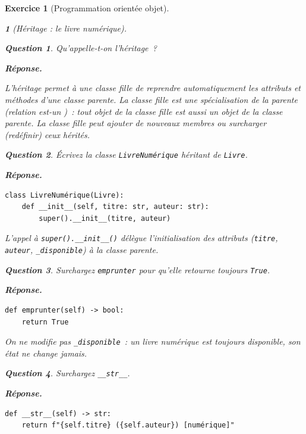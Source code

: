 \documentclass{article}
\theoremstyle{exostyle}
\newtheorem{exo}{Exercice}
\theoremstyle{partiestyle}
\newtheorem{partie}{}[exo]
\theoremstyle{questionstyle}
\newtheorem{questionpartie}{Question}[partie]
\newenvironment{reponse}{%
    \par\smallskip\noindent\textbf{Réponse.}\enspace\ignorespaces
}{%
    \par\smallskip
}
\begin{document}
\begin{exo}[Programmation orientée objet]
\begin{partie}[Héritage : le livre numérique]
        \begin{questionpartie}
            Qu'appelle-t-on l'héritage~?
        \end{questionpartie}
        \begin{reponse}
            L'héritage permet à une classe \textit{fille} de reprendre automatiquement les attributs et méthodes d'une classe \textit{parente}. La classe fille est une spécialisation de la parente (relation \og est-un \fg{})~: tout objet de la classe fille \textit{est aussi} un objet de la classe parente. La classe fille peut ajouter de nouveaux membres ou \textit{surcharger} (redéfinir) ceux hérités.
        \end{reponse}

        \begin{questionpartie}
            Écrivez la classe \texttt{LivreNumérique} héritant de \texttt{Livre}.
        \end{questionpartie}
        \begin{reponse}
\begin{lstlisting}
class LivreNumérique(Livre):
    def __init__(self, titre: str, auteur: str):
        super().__init__(titre, auteur)
\end{lstlisting}
            L'appel à \texttt{super().\_\_init\_\_()} délègue l'initialisation des attributs (\texttt{titre}, \texttt{auteur}, \texttt{\_disponible}) à la classe parente.
        \end{reponse}

        \begin{questionpartie}
            Surchargez \texttt{emprunter} pour qu'elle retourne toujours \texttt{True}.
        \end{questionpartie}
        \begin{reponse}
\begin{lstlisting}
def emprunter(self) -> bool:
    return True
\end{lstlisting}
            On ne modifie pas \texttt{\_disponible}~: un livre numérique est toujours disponible, son état ne change jamais.
        \end{reponse}

        \begin{questionpartie}
            Surchargez \texttt{\_\_str\_\_}.
        \end{questionpartie}
        \begin{reponse}
\begin{lstlisting}
def __str__(self) -> str:
    return f"{self.titre} ({self.auteur}) [numérique]"
\end{lstlisting}
        \end{reponse}


\end{partie}
\end{exo}
\end{document}
